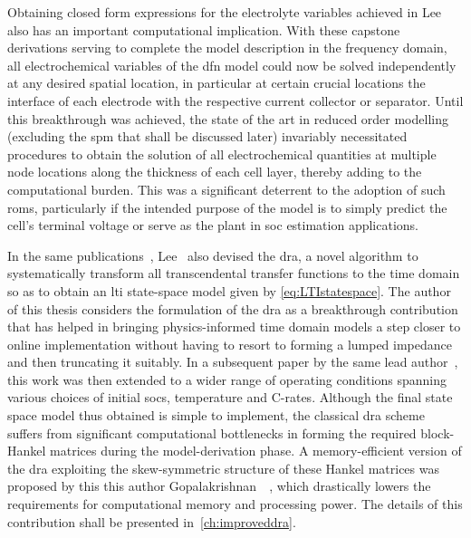 Obtaining  closed form  expressions for  the electrolyte  variables achieved  in
Lee~\etal{} also has an important computational implication. With these capstone
derivations serving to  complete the model description in  the frequency domain,
all  electrochemical  variables of  the  \gls{dfn}  model  could now  be  solved
independently at any desired spatial  location, in particular at certain crucial
locations  \eg{} the  interface of  each electrode  with the  respective current
collector or separator.  Until this breakthrough was achieved, the  state of the
art in reduced order modelling (excluding  the \gls{spm} that shall be discussed
later)  invariably  necessitated  procedures  to  obtain  the  solution  of  all
electrochemical quantities  at multiple  node locations  along the  thickness of
each  cell  layer, thereby  adding  to  the  computational  burden. This  was  a
significant deterrent to  the adoption of such \glspl{rom},  particularly if the
intended purpose of  the model is to simply predict  the cell's terminal voltage
or serve as the plant in \gls{soc} estimation applications.


In the  same publications~\cite{Lee2012a,Lee2012}, Lee~\etal{} also  devised the
\gls{dra},  a novel  algorithm  to systematically  transform all  transcendental
transfer functions to  the time domain so as to  obtain an \gls{lti} state-space
model  given by  \cref{eq:LTIstatespace}. The  author of  this thesis  considers
the  formulation  of the  \gls{dra}  as  a  breakthrough contribution  that  has
helped  in  bringing  physics-informed  time  domain models  a  step  closer  to
online implementation  without having  to resort to  forming a  lumped impedance
and  then  truncating it  suitably.  In  a subsequent  paper  by  the same  lead
author~\cite{Lee2014}, this work was then extended to a wider range of operating
conditions  spanning various  choices  of initial  \glspl{soc}, temperature  and
C-rates.  Although the  final  state  space model  thus  obtained  is simple  to
implement, the classical \gls{dra} scheme suffers from significant computational
bottlenecks   in  forming   the  required   block-Hankel  matrices   during  the
model-derivation phase.  A memory-efficient version of  the \gls{dra} exploiting
the skew-symmetric structure of these Hankel  matrices was proposed by this this
author \ie{} Gopalakrishnan~\etal{}~\cite{Gopalakrishnan2017}, which drastically
lowers  the requirements  for  computational memory  and  processing power.  The
details of this contribution shall be presented in~\cref{ch:improveddra}.


